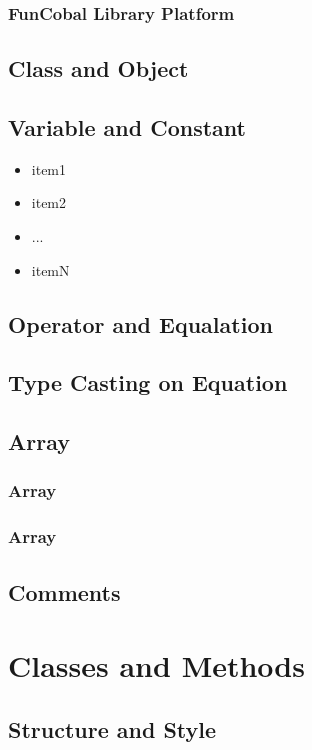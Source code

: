 \documentclass{jarticle}
\begin{document}
\subsubsection{FunCobal Library Platform}
\newpage
\subsection{Class and Object}
\subsection{Variable and Constant}
\begin{itemize}
  \item item1
  \item item2
  \item ...
  \item itemN
\end{itemize}
\subsection{Operator and Equalation}
\subsection{Type Casting on Equation}
\subsection{Array}
\subsubsection{Array}
\subsubsection{Array}
\subsection{Comments}
\newpage
\section{Classes and Methods}
\subsection{Structure and Style}
\end{document}
